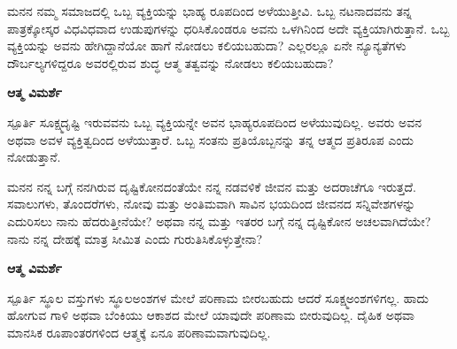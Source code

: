 
\begin{mananam}{\kanfont ಮನನ}
\footnotesize \mananamfont ನಮ್ಮ ಸಮಾಜದಲ್ಲಿ ಒಬ್ಬ ವ್ಯಕ್ತಿಯನ್ನು ಭಾಹ್ಯ ರೂಪದಿಂದ ಅಳೆಯುತ್ತೀವಿ. ಒಬ್ಬ ನಟನಾದವನು ತನ್ನ ಪಾತ್ರಕ್ಕೋಸ್ಕರ ವಿಧವಿಧವಾದ ಉಡುಪುಗಳನ್ನು ಧರಿಸಿಕೊಂಡರೂ ಅವನು ಒಳಗಿನಿಂದ ಅದೇ ವ್ಯಕ್ತಿಯಾಗಿರುತ್ತಾನೆ. ಒಬ್ಬ ವ್ಯಕ್ತಿಯನ್ನು ಅವನು ಹೇಗಿದ್ದಾನೆಯೋ ಹಾಗೆ ನೋಡಲು ಕಲಿಯಬಹುದಾ? ಎಲ್ಲರಲ್ಲೂ ಏನೇ ನ್ಯೂನ್ಯತೆಗಳು ದೌರ್ಬಲ್ಯಗಳಿದ್ದರೂ ಅವರಲ್ಲಿರುವ ಶುದ್ಧ ಆತ್ಮ ತತ್ವವನ್ನು ನೋಡಲು ಕಲಿಯಬಹುದಾ?
\end{mananam}
\WritingHand\enspace\textbf{ಆತ್ಮ ವಿಮರ್ಶೆ}
\begin{inspiration}{\kanfont ಸ್ಪೂರ್ತಿ}
\footnotesize \mananamfont ಸೂಕ್ಷ್ಮದೃಷ್ಟಿ ಇರುವವನು ಒಬ್ಬ ವ್ಯಕ್ತಿಯನ್ನೇ ಅವನ ಭಾಹ್ಯರೂಪದಿಂದ ಅಳೆಯುವುದಿಲ್ಲ. ಅವರು ಅವನ ಅಥವಾ ಅವಳ ವ್ಯಕ್ತಿತ್ವದಿಂದ ಅಳೆಯುತ್ತಾರೆ. ಒಬ್ಬ ಸಂತನು ಪ್ರತಿಯೊಬ್ಬನನ್ನು ತನ್ನ ಆತ್ಮದ ಪ್ರತಿರೂಪ ಎಂದು ನೋಡುತ್ತಾನೆ.
\end{inspiration}


\begin{mananam}{\kanfont ಮನನ}
\footnotesize \mananamfont ನನ್ನ ಬಗ್ಗೆ ನನಗಿರುವ ದೃಷ್ಟಿಕೋನದಂತೆಯೇ ನನ್ನ ನಡವಳಿಕೆ ಜೀವನ ಮತ್ತು ಅದರಾಚೆಗೂ ಇರುತ್ತದೆ. ಸವಾಲುಗಳು, ತೊಂದರೆಗಳು, ನೋವು ಮತ್ತು ಅಂತಿಮವಾಗಿ ಸಾವಿನ ಭಯದಿಂದ ಜೀವನದ ಸನ್ನಿವೇಶಗಳನ್ನು ಎದುರಿಸಲು ನಾನು ಹೆದರುತ್ತೀನೆಯೇ? ಅಥವಾ ನನ್ನ ಮತ್ತು ಇತರರ ಬಗ್ಗೆ ನನ್ನ ದೃಷ್ಟಿಕೋನ ಅಚಲವಾಗಿದೆಯೇ? ನಾನು ನನ್ನ ದೇಹಕ್ಕೆ ಮಾತ್ರ ಸೀಮಿತ ಎಂದು ಗುರುತಿಸಿಕೊಳ್ಳುತ್ತೇನಾ?
\end{mananam}
\WritingHand\enspace\textbf{ಆತ್ಮ ವಿಮರ್ಶೆ}
\begin{inspiration}{\kanfont ಸ್ಪೂರ್ತಿ}
\footnotesize \mananamfont ಸ್ಥೂಲ ವಸ್ತುಗಳು ಸ್ಥೂಲಅಂಶಗಳ ಮೇಲೆ ಪರಿಣಾಮ ಬೀರಬಹುದು ಆದರೆ ಸೂಕ್ಷ್ಮಅಂಶಗಳಿಗಲ್ಲ. ಹಾದು ಹೋಗುವ ಗಾಳಿ ಅಥವಾ ಬೆಂಕಿಯು ಆಕಾಶದ ಮೇಲೆ ಯಾವುದೇ ಪರಿಣಾಮ ಬೀರುವುದಿಲ್ಲ. ದೈಹಿಕ ಅಥವಾ ಮಾನಸಿಕ ರೂಪಾಂತರಗಳಿಂದ ಆತ್ಮಕ್ಕೆ ಏನೂ ಪರಿಣಾಮವಾಗುವುದಿಲ್ಲ.
\end{inspiration}

